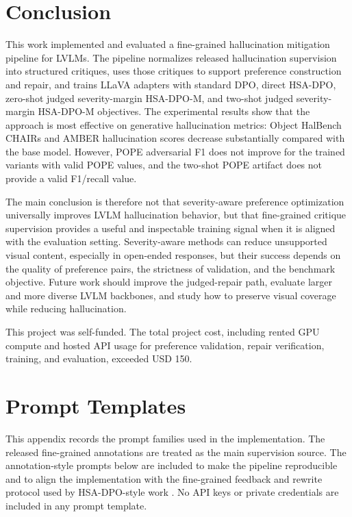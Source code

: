 \documentclass{article}
\begin{document}
\section{Conclusion}

This work implemented and evaluated a fine-grained hallucination mitigation pipeline for LVLMs. The pipeline normalizes released hallucination supervision into structured critiques, uses those critiques to support preference construction and repair, and trains LLaVA adapters with standard DPO, direct HSA-DPO, zero-shot judged severity-margin HSA-DPO-M, and two-shot judged severity-margin HSA-DPO-M objectives. The experimental results show that the approach is most effective on generative hallucination metrics: Object HalBench CHAIRs and AMBER hallucination scores decrease substantially compared with the base model. However, POPE adversarial F1 does not improve for the trained variants with valid POPE values, and the two-shot POPE artifact does not provide a valid F1/recall value.

The main conclusion is therefore not that severity-aware preference optimization universally improves LVLM hallucination behavior, but that fine-grained critique supervision provides a useful and inspectable training signal when it is aligned with the evaluation setting. Severity-aware methods can reduce unsupported visual content, especially in open-ended responses, but their success depends on the quality of preference pairs, the strictness of validation, and the benchmark objective. Future work should improve the judged-repair path, evaluate larger and more diverse LVLM backbones, and study how to preserve visual coverage while reducing hallucination.

\begin{ack}
This project was self-funded. The total project cost, including rented GPU compute and hosted API usage for preference validation, repair verification, training, and evaluation, exceeded USD 150.
\end{ack}




\appendix

\section{Prompt Templates}
\label{app:prompts}

This appendix records the prompt families used in the implementation. The released fine-grained annotations are treated as the main supervision source. The annotation-style prompts below are included to make the pipeline reproducible and to align the implementation with the fine-grained feedback and rewrite protocol used by HSA-DPO-style work \citep{xiao2025hsa}. No API keys or private credentials are included in any prompt template.
\end{document}
